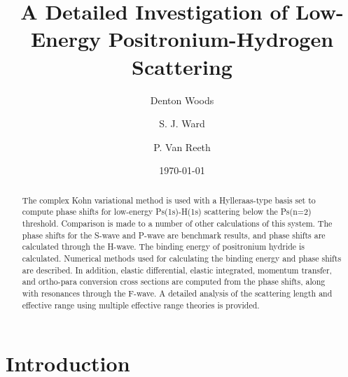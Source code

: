 \documentclass[reprint,showpacs,preprintnumbers,amsmath,amssymb,pra,aps]{revtex4-1}
\begin{document}

\title{A Detailed Investigation of Low-Energy Positronium-Hydrogen Scattering}

\author{Denton Woods}
\author{S. J. Ward}

\author{P. Van Reeth}

\date{\today}%

\begin{abstract}
The complex Kohn variational method is used with a Hylleraas-type basis set to compute phase shifts for low-energy Ps(1s)-H(1s) scattering below the Ps(n=2) threshold. Comparison is made to a number of other calculations of this system. The phase shifts for the S-wave and P-wave are benchmark results, and phase shifts are calculated through the H-wave. The binding energy of positronium hydride is calculated. Numerical methods used for calculating the binding energy and phase shifts are described. In addition, elastic differential, elastic integrated, momentum transfer, and ortho-para conversion cross sections are computed from the phase shifts, along with resonances through the F-wave. A detailed analysis of the scattering length and effective range using multiple effective range theories is provided.
\end{abstract}
   
\maketitle

\section{\label{sec:Intro}\protect Introduction}


\end{document}

